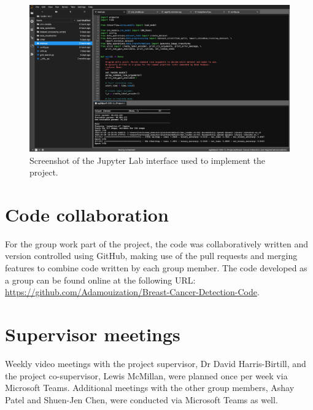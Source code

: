 \begin{figure}[ht]
\centerline{\includegraphics[width=\textwidth]{Dissertation/figures/appendix/jupyter_interface.png}}
\caption{\label{fig:appendix-jupyter_interface}Screenshot of the Jupyter Lab interface used to implement the project.}
\end{figure}

\section{Code collaboration}

For the group work part of the project, the code was collaboratively written and version controlled using GitHub, making use of the pull requests and merging features to combine code written by each group member. The code developed as a group can be found online at the following URL: \url{https://github.com/Adamouization/Breast-Cancer-Detection-Code}.

\section{Supervisor meetings}

Weekly video meetings with the project supervisor, Dr David Harris-Birtill, and the project co-supervisor, Lewis McMillan, were planned once per week via Microsoft Teams. Additional meetings with the other group members, Ashay Patel and Shuen-Jen Chen, were conducted via Microsoft Teams as well.